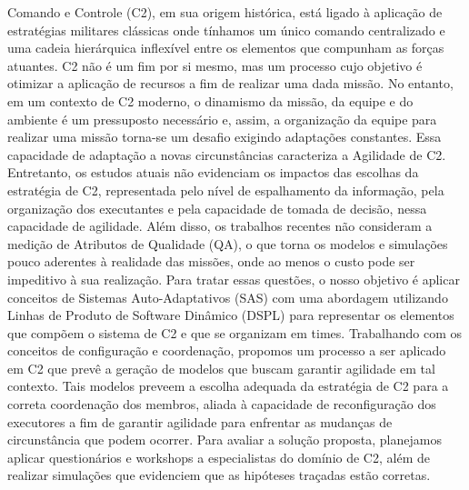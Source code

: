 Comando e Controle (C2), em sua origem histórica, está ligado à aplicação de estratégias militares clássicas onde tínhamos um único comando centralizado e uma cadeia hierárquica inflexível entre os elementos que compunham as forças atuantes. C2 não é um fim por si mesmo, mas um processo cujo objetivo é otimizar a aplicação de recursos a fim de realizar uma dada missão. No entanto, em um contexto de C2 moderno, o dinamismo da missão, da equipe e do ambiente é um pressuposto necessário e, assim, a organização da equipe para realizar uma missão torna-se um desafio exigindo adaptações constantes. Essa capacidade de adaptação a novas circunstâncias caracteriza a Agilidade de C2. Entretanto, os estudos atuais não evidenciam os impactos das escolhas da estratégia de C2, representada pelo nível de espalhamento da informação, pela organização dos executantes e pela capacidade de tomada de decisão, nessa capacidade de agilidade. Além disso, os trabalhos recentes não consideram a medição de Atributos de Qualidade (QA), o que torna os modelos e simulações pouco aderentes à realidade das missões, onde ao menos o custo pode ser impeditivo à sua realização. Para tratar essas questões, o nosso objetivo é aplicar conceitos de Sistemas Auto-Adaptativos (SAS) com uma abordagem utilizando Linhas de Produto de Software Dinâmico (DSPL) para representar os elementos que compõem o sistema de C2 e que se organizam em times. Trabalhando com os conceitos de configuração e coordenação, propomos um processo a ser aplicado em C2 que prevê a geração de modelos que buscam garantir agilidade em tal contexto. Tais modelos preveem a escolha adequada da estratégia de C2 para a correta coordenação dos membros, aliada à capacidade de reconfiguração dos  executores a fim de garantir agilidade para enfrentar as mudanças de circunstância que podem ocorrer. Para avaliar a solução proposta, planejamos aplicar questionários e workshops a especialistas do domínio de C2, além de realizar simulações que evidenciem que as hipóteses traçadas estão corretas.